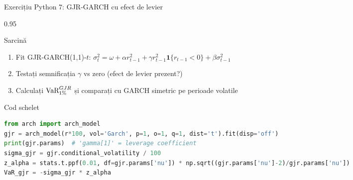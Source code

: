 \documentclass[9pt, aspectratio=169, t]{beamer}
\begin{document}
\begin{frame}[fragile,shrink=10]{Exercițiu Python 7: GJR-GARCH cu efect de levier}
\begin{cminipage}{0.95\textwidth}
    \begin{block}{Sarcină}
    \begin{enumerate}\setlength{\itemsep}{0pt}
        \item Fit GJR-GARCH(1,1)-$t$: $\sigma^2_t = \omega + \alpha r^2_{t-1} + \gamma r^2_{t-1}\mathbf{1}\{r_{t-1}<0\} + \beta \sigma^2_{t-1}$
        \item Testați semnificația $\gamma$ vs zero (efect de levier prezent?)
        \item Calculați $\text{VaR}^{GJR}_{1\%}$ și comparați cu GARCH simetric pe perioade volatile
    \end{enumerate}
    \end{block}
    \begin{exampleblock}{Cod schelet}
\begin{lstlisting}[language=Python]
from arch import arch_model
gjr = arch_model(r*100, vol='Garch', p=1, o=1, q=1, dist='t').fit(disp='off')
print(gjr.params)  # 'gamma[1]' = leverage coefficient
sigma_gjr = gjr.conditional_volatility / 100
z_alpha = stats.t.ppf(0.01, df=gjr.params['nu']) * np.sqrt((gjr.params['nu']-2)/gjr.params['nu'])
VaR_gjr = -sigma_gjr * z_alpha
\end{lstlisting}
    \end{exampleblock}
\end{cminipage}
\end{frame}
\end{document}
